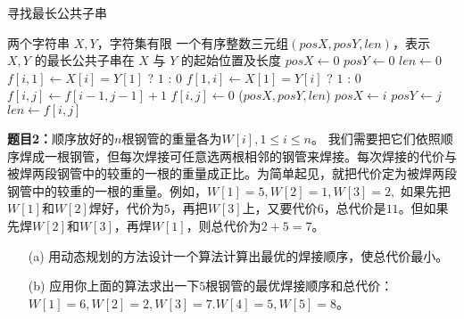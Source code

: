 \documentclass[12pt,a4paper]{ctexart}
\begin{document}
\begin{algorithm}
  \caption{寻找最长公共子串}\label{algo:t1}
  \begin{algorithmic}[1]
    \Require 两个字符串 $X, Y$，字符集有限
    \Ensure 一个有序整数三元组$(posX, posY, len)$，表示 $X, Y$ 的最长公共子串在 $X$ 与 $Y$ 的起始位置及长度
      \State $posX \gets 0$
      \State $posY \gets 0$
      \State $len \gets 0$
        \State $f[i, 1] \gets X[i] = Y[1]$ ? $1$ : $0$
        \State {}
      \EndFor
        \State $f[1, i] \gets X[1] = Y[i]$ ? $1$ : $0$
        \State {}
      \EndFor
            \State $f[i, j] \gets f[i - 1, j - 1] + 1$
          \Else
            \State $f[i, j] \gets 0$
          \EndIf
          \State {}
        \EndFor
      \EndFor
      \State \Return ($posX, posY, len$)
      \Statex
          \State $posX \gets i$
          \State $posY \gets j$
          \State $len \gets f[i, j]$
        \EndIf
      \EndProcedure
    \EndFunction
  \end{algorithmic}
\end{algorithm}

\clearpage

\vspace{10pt}
\noindent
{\bf 题目2：}顺序放好的$n$根钢管的重量各为$W[i], 1 \leq i \leq n$。
我们需要把它们依照顺序焊成一根钢管，但每次焊接可任意选两根相邻的钢管来焊接。每次焊接的代价与被焊两段钢管中的较重的一根的重量成正比。为简单起见，就把代价定为被焊两段钢管中的较重的一根的重量。例如，$W[1]=5, W[2]=1, W[3]=2, $ 如果先把$W[1]$和$W[2]$焊好，代价为$5$，再把$W[3]$上，又要代价$6$，总代价是$11$。但如果先焊$W[2]$和$W[3]$，再焊$W[1]$，则总代价为$2+5=7$。
\begin{enumerate}
  \item[(a)]  用动态规划的方法设计一个算法计算出最优的焊接顺序，使总代价最小。
  \item[(b)]  应用你上面的算法求出一下$5$根钢管的最优焊接顺序和总代价：$W[1]=6, W[2]=2, W[3]=7. W[4]=5, W[5]=8$。
\end{enumerate}
\end{document}
